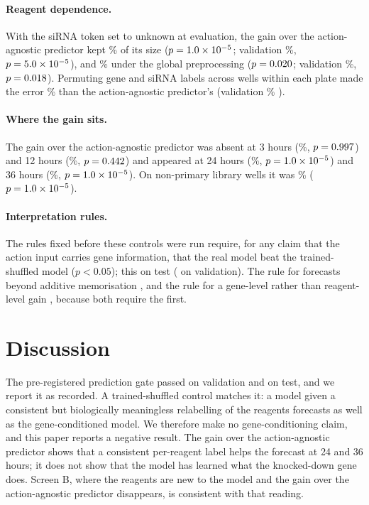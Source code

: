 \paragraph{Reagent dependence.} With the siRNA token set to unknown at evaluation, the gain over
the action-agnostic predictor kept \RobThreeFracTest\% of its size ($p=1.0\times10^{-5}$;
validation \RobThreeFracVal\%, $p=5.0\times10^{-5}$), and \RobThreeGlobalFracTest\% under the
global preprocessing ($p=0.020$; validation \RobThreeGlobalFracVal\%,
$p=0.018$). Permuting gene and siRNA labels across wells within each plate made
the error \RobThreePermRelTest\% \RobThreePermDirTest{} than the action-agnostic predictor's
(validation \RobThreePermRelVal\% \RobThreePermDirVal).

\paragraph{Where the gain sits.} The gain over the action-agnostic predictor was absent at 3
hours (\RobFourThreehTest\%, $p=0.997$) and 12 hours (\RobFourTwelvehTest\%,
$p=0.442$) and appeared at 24 hours (\RobFourTwentyFourhTest\%,
$p=1.0\times10^{-5}$) and 36 hours (\RobFourThirtySixhTest\%,
$p=1.0\times10^{-5}$). On non-primary library wells it was \RobFourNonPrimRelTest\%
($p=1.0\times10^{-5}$).

\paragraph{Interpretation rules.} The rules fixed before these controls were run require, for
any claim that the action input carries gene information, that the real model beat the
trained-shuffled model ($p<0.05$); this \RobIOneTest{} on test (\RobIOneVal{} on validation).
The rule for forecasts beyond additive memorisation \RobITwoTest, and the rule for a gene-level
rather than reagent-level gain \RobIThreeTest, because both require the first.

\section{Discussion}\label{sec:discussion}

The pre-registered prediction gate passed on validation and on test, and we report it as
recorded. A trained-shuffled control matches it: a model given a consistent but biologically
meaningless relabelling of the reagents forecasts as well as the gene-conditioned model. We
therefore make no gene-conditioning claim, and this paper reports a negative result. The gain
over the action-agnostic predictor shows that a consistent per-reagent label helps the forecast
at 24 and 36 hours; it does not show that the model has learned what the knocked-down gene does.
Screen B, where the reagents are new to the model and the gain over the action-agnostic
predictor disappears, is consistent with that reading.

